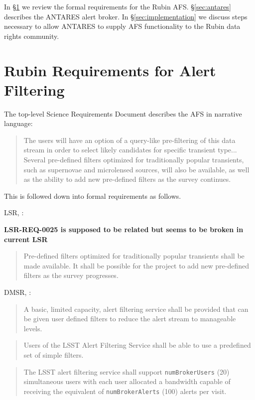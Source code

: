 \documentclass[DM,authoryear,toc]{lsstdoc}
\begin{document}
In \S \ref{sec:requirements} we review the formal requirements for the Rubin AFS.
\S \ref{sec:antares} describes the ANTARES alert broker.
In \S \ref{sec:implementation} we discuss steps necessary to allow ANTARES to supply AFS functionality to the Rubin data rights community.

\section{Rubin Requirements for Alert Filtering} \label{sec:requirements}

The top-level Science Requirements Document  describes the AFS in narrative language:
%
\begin{quote}
The users will have an option of a query-like pre-filtering of this data stream in order to select likely candidates for specific transient type...
Several pre-defined filters optimized for traditionally popular transients, such as supernovae and microlensed sources, will
also be available, as well as the ability to add new pre-defined filters as the survey continues.
\end{quote}

This is followed down into formal requirements as follows.

LSR, :

\textbf{LSR-REQ-0025 is supposed to be related but seems to be broken in current LSR}

\begin{quote}
Pre-defined filters optimized for traditionally popular transients shall be made available. 
It shall be possible for the project to add new pre-defined filters as the survey progresses.
\end{quote}


DMSR, :

\begin{quote}
A basic, limited capacity, alert filtering service shall be provided that can be given user defined filters to reduce the alert stream to manageable levels.
\end{quote}

\begin{quote}
Users of the LSST Alert Filtering Service shall be able to use a predefined set of simple filters.
\end{quote}

\begin{quote}
The LSST alert filtering service shall support \texttt{numBrokerUsers} (20) simultaneous
users with each user allocated a bandwidth capable of receiving the equivalent of
\texttt{numBrokerAlerts} (100) alerts per visit.
\end{quote}
\end{document}
